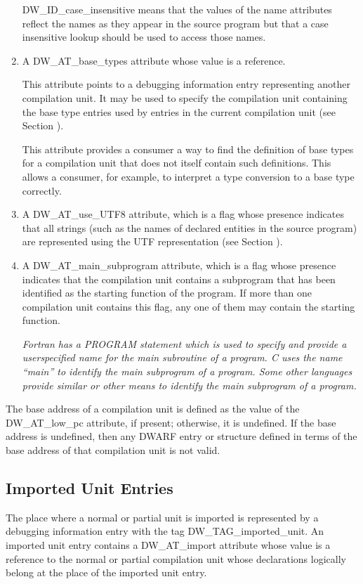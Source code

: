 \begin{enumerate}[1]
DW\_ID\_case\_insensitive means that the values of the name
attributes reflect the names as they appear in the source
program but that a case insensitive lookup should be used to
access those names.

\item A DW\_AT\_base\_types attribute whose value is a reference.

This attribute points to a debugging information entry
representing another compilation unit.  It may be used
to specify the compilation unit containing the base type
entries used by entries in the current compilation unit
(see Section ).

This attribute provides a consumer a way to find the definition
of base types for a compilation unit that does not itself
contain such definitions. This allows a consumer, for example,
to interpret a type conversion to a base type correctly.

\item A DW\_AT\_use\_UTF8 attribute, which is a flag whose
presence indicates that all strings (such as the names of
declared entities in the source program) are represented
using the UTF representation 
(see Section ).


\item A DW\_AT\_main\_subprogram attribute, which is a flag
whose presence indicates that the compilation unit contains a
subprogram that has been identified as the starting function
of the program. If more than one compilation unit contains
this flag, any one of them may contain the starting function.

\textit{Fortran has a PROGRAM statement which is used
to specify and provide a user\dash specified name for the main
subroutine of a program. C uses the name “main” to identify
the main subprogram of a program. Some other languages provide
similar or other means to identify the main subprogram of
a program.}

\end{enumerate}

The  base address of a compilation unit is defined as the
value of the DW\_AT\_low\_pc attribute, if present; otherwise,
it is undefined. If the base address is undefined, then any
DWARF entry or structure defined in terms of the base address
of that compilation unit is not valid.


\subsection{Imported Unit Entries}
\label{chap:importedunitentries}
The place where a normal or partial unit is imported is
represented by a debugging information entry with the tag
DW\_TAG\_imported\_unit. An imported unit entry contains a
DW\_AT\_import attribute whose value is a reference to the
normal or partial compilation unit whose declarations logically
belong at the place of the imported unit entry.

